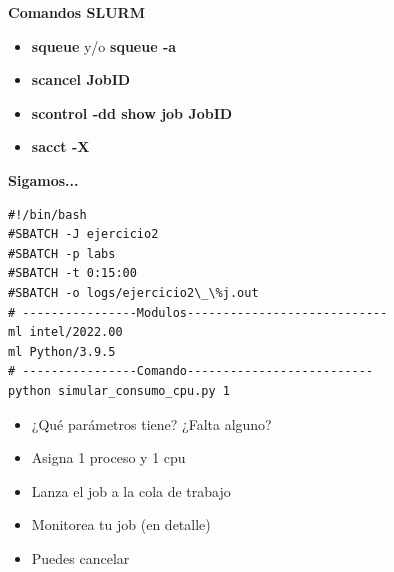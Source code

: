 \documentclass[aspectratio=169,professionalfonts]{beamer}
\newenvironment{minted}[2][]{\VerbatimEnvironment\begin{Verbatim}[#1]}{\end{Verbatim}}
\begin{document}
\begin{frame}{\textbf{Comandos SLURM}}
    \begin{itemize}
        \item \textbf{squeue} y/o \textbf{squeue -a}
         \vspace{0.5em} 
        \item \textbf{scancel JobID}
         \vspace{0.5em} 
        \item \textbf{scontrol -dd show job JobID}
         \vspace{0.5em} 
        \item \textbf{sacct -X}
        
    \end{itemize}
\end{frame}


\begin{frame}[fragile]{\textbf{Sigamos...}}


\begin{verbatim}
#!/bin/bash 
#SBATCH -J ejercicio2 
#SBATCH -p labs 
#SBATCH -t 0:15:00 
#SBATCH -o logs/ejercicio2\_\%j.out 
# ----------------Modulos---------------------------- 
ml intel/2022.00
ml Python/3.9.5 
# ----------------Comando-------------------------- 
python simular_consumo_cpu.py 1
\end{verbatim}



\begin{itemize}
    \item ¿Qué parámetros tiene? ¿Falta alguno?
         \vspace{0.5em} 
    \item Asigna 1 proceso y 1 cpu
         \vspace{0.5em} 
    \item Lanza el job a la cola de trabajo
         \vspace{0.5em} 
    \item Monitorea tu job (en detalle)
         \vspace{0.5em} 
    \item Puedes cancelar 
\end{itemize}
    
\end{frame}
\end{document}

